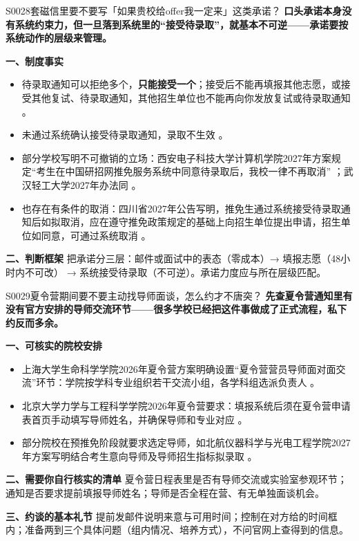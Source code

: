 \begin{qa}{S0028}{套磁信里要不要写「如果贵校给offer我一定来」这类承诺？}
\textbf{口头承诺本身没有系统约束力，但一旦落到系统里的“接受待录取”，就基本不可逆——承诺要按系统动作的层级来管理。}

\textbf{一、制度事实}
\begin{itemize}
  \item 待录取通知可以拒绝多个，\textbf{只能接受一个}；接受后不能再填报其他志愿，或接受其他复试、待录取通知，其他招生单位也不能再向你发放复试或待录取通知 。
  \item 未通过系统确认接受待录取通知，录取不生效 。
  \item 部分学校写明不可撤销的立场：西安电子科技大学计算机学院2027年方案规定“考生在中国研招网推免服务系统中同意待录取后，我校一律不再取消” ；武汉轻工大学2027年办法同 。
  \item 也存在有条件的取消：四川省2027年公告写明，推免生通过系统接受待录取通知后如拟取消，应在遵守推免政策规定的基础上向招生单位提出申请，招生单位如同意，可通过系统取消 。
\end{itemize}

\textbf{二、判断框架}
把承诺分三层：邮件或面试中的表态（零成本）→ 填报志愿（48小时内不可改） → 系统接受待录取（不可逆）。承诺力度应与所在层级匹配。
\end{qa}

\begin{qa}{S0029}{夏令营期间要不要主动找导师面谈，怎么约才不唐突？}
\textbf{先查夏令营通知里有没有官方安排的导师交流环节——很多学校已经把这件事做成了正式流程，私下约反而多余。}

\textbf{一、可核实的院校安排}
\begin{itemize}
  \item 上海大学生命科学学院2026年夏令营方案明确设置“夏令营营员导师面对面交流”环节：学院按学科专业组织若干交流小组，各学科组选派负责人 。
  \item 北京大学力学与工程科学学院2026年夏令营要求：填报系统后须在夏令营申请表首页手动填写导师姓名，并确保导师和专业对应 。
  \item 部分院校在预推免阶段就要求选定导师，如北航仪器科学与光电工程学院2027年方案写明结合考生意向导师及导师招生指标拟录取 。
\end{itemize}

\textbf{二、需要你自行核实的清单}
夏令营日程表里是否有导师交流或实验室参观环节；通知是否要求提前填报导师姓名；导师是否全程在营、有无单独面谈机会。

\textbf{三、约谈的基本礼节}
提前发邮件说明来意与可用时间；控制在对方给的时间框内；准备两到三个具体问题（组内情况、培养方式），不问官网上查得到的信息。
\end{qa}

